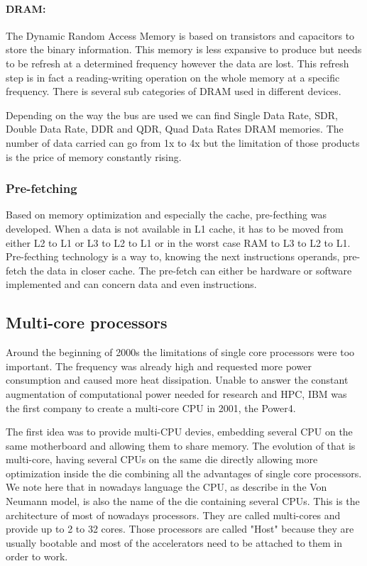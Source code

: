 \paragraph{DRAM: }
The Dynamic Random Access Memory is based on transistors and capacitors to store the binary information.
This memory is less expansive to produce but needs to be refresh at a determined frequency however the data are lost. 
This refresh step is in fact a reading-writing operation on the whole memory at a specific frequency. 
There is several sub categories of DRAM used in different devices.

Depending on the way the bus are used we can find Single Data Rate, SDR, Double Data Rate, DDR and QDR, Quad Data Rates DRAM memories. 
The number of data carried can go from 1x to 4x but the limitation of those products is the price of memory constantly rising.  

\subsubsection{Pre-fetching} 
Based on memory optimization and especially the cache, pre-fecthing was developed.
When a data is not available in L1 cache, it has to be moved from either L2 to L1 or L3 to L2 to L1 or in the worst case RAM to L3 to L2 to L1. 
Pre-fecthing technology is a way to, knowing the next instructions operands, pre-fetch the data in closer cache. 
The pre-fetch can either be hardware or software implemented and can concern data and even instructions.

\subsection{Multi-core processors}
Around the beginning of 2000s the limitations of single core processors were too important. 
The frequency was already high and requested more power consumption and caused more heat dissipation. 
Unable to answer the constant augmentation of computational power needed for research and HPC, IBM was the first company to create a multi-core CPU in 2001, the Power4. 

The first idea was to provide multi-CPU devies, embedding several CPU on the same motherboard and allowing them to share memory. 
The evolution of that is multi-core, having several CPUs on the same die directly allowing more optimization inside the die combining all the advantages of single core processors.
We note here that in nowadays language the CPU, as describe in the Von Neumann model, is also the name of the die containing several CPUs. 
This is the architecture of most of nowadays processors. 
They are called multi-cores and provide up to 2 to 32 cores. 
Those processors are called "Host" because they are usually bootable and most of the accelerators need to be attached to them in order to work.

